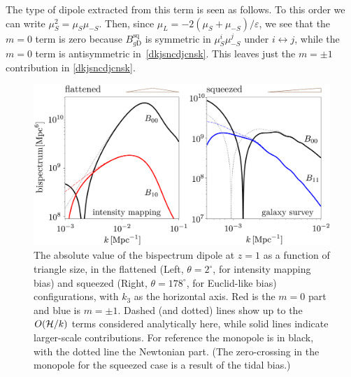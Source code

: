The type of dipole extracted from this term is seen as follows. To this order we can write $\mu_{S}^2=\mu_{S}\mu_{-S}$. Then,  since $\mu_L=-2(\mu_S+\mu_{-S})/
\varepsilon$, we see that the $m=0$ term is zero because $B_{g {\mathrm{D}}}^{\mathrm{sq}}$ is symmetric in $\mu_{S}^i\mu_{-S}^j$ under $i\leftrightarrow j$, while the $m=0$ term is antisymmetric in~\eqref{dkjsncdjcnsk}. This leaves just the $m=\pm1$ contribution in \eqref{dkjsncdjcnsk}.




\begin{figure}%
\begin{center}
\includegraphics[width=\columnwidth]{fig/figuresv2-02}
\caption{ The absolute value of the bispectrum dipole at $z=1$  as a function of triangle size, in the flattened (Left, $\theta=2^\circ$, for intensity mapping bias) and squeezed (Right, $\theta=178^\circ$, for Euclid-like bias) configurations, with $k_3$ as the horizontal axis. Red is the $m=0$ part and blue is $m=\pm1$. Dashed (and dotted) lines show up to the $O(\mathcal{H}/k)$ terms considered analytically here, while solid lines indicate larger-scale contributions. For reference the monopole is in black, with the dotted line the Newtonian part.  (The zero-crossing in the monopole for the squeezed case is a result of the tidal bias.)}
\label{snakcjnsdlkcans}
\end{center}
\end{figure}

